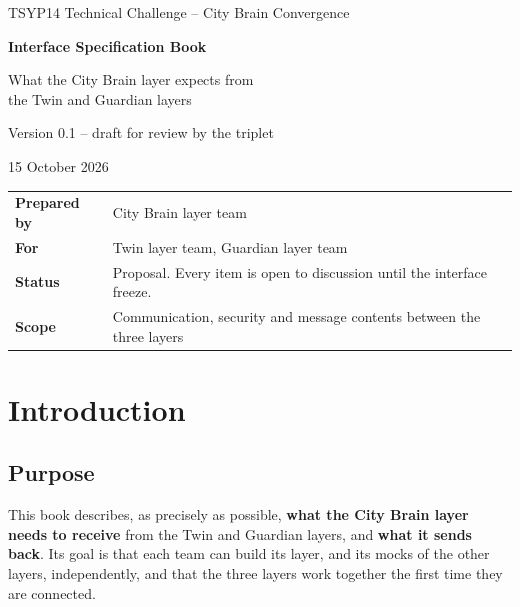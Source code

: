 \documentclass[11pt,a4paper]{article}
\begin{document}
\begin{titlepage}
\centering
\vspace*{3cm}
{\Large\color{brand} TSYP14 Technical Challenge -- City Brain Convergence\par}
\vspace{1.2cm}
{\Huge\bfseries Interface Specification Book\par}
\vspace{0.6cm}
{\LARGE What the City Brain layer expects from\\ the Twin and Guardian layers\par}
\vspace{1.5cm}
{\large Version 0.1 -- draft for review by the triplet\par}
\vspace{0.3cm}
{\large 15 October 2026\par}
\vfill
\begin{tabularx}{0.85\linewidth}{@{}lY@{}}
\toprule
\textbf{Prepared by} & City Brain layer team \\
\textbf{For} & Twin layer team, Guardian layer team \\
\textbf{Status} & Proposal. Every item is open to discussion until the interface freeze. \\
\textbf{Scope} & Communication, security and message contents between the three layers \\
\bottomrule
\end{tabularx}
\vspace{1cm}
\end{titlepage}

\tableofcontents
\newpage

\section{Introduction}

\subsection{Purpose}
This book describes, as precisely as possible, \textbf{what the City Brain layer needs to receive} from the Twin and Guardian layers, and \textbf{what it sends back}. Its goal is that each team can build its layer, and its mocks of the other layers, independently, and that the three layers work together the first time they are connected.
\end{document}
